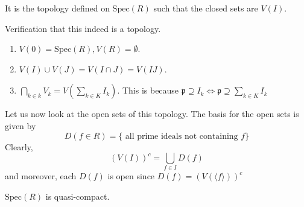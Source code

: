 \documentclass[oneside, 12pt, ]{scrbook}
\theoremstyle{theorem}
\begin{document}
\begin{definition}
It is the topology defined on $\mathrm{Spec}(R)$ such that the closed sets are $V(I)$.
\end{definition}

Verification that this indeed is a topology. 
\begin{enumerate}
\item $V(0) = \mathrm{Spec}(R), V(R) = \emptyset$.
\item $V(I) \cup V(J) = V(I\cap J) = V(IJ)$.
\item $\bigcap_{k \in k} V_{k} = V(\sum_{k \in K} I_{k})$. This is because $\mathfrak{p} \supseteq I_{k} \Leftrightarrow \mathfrak{p} \supseteq \sum_{k \in K}I_{k}$
\end{enumerate}

Let us now look at the open sets of this topology. The basis for the open sets is given by $$D(f \in R) = \{ \text{ all prime ideals not containing } f\}$$
Clearly, $$(V(I))^c = \bigcup_{f \in I} D(f)$$ and moreover, each $D(f)$ is open since $D(f) = (V(\langle f \rangle))^c$

\begin{theorem}
$\mathrm{Spec}(R)$ is quasi-compact.
\end{theorem}
\end{document}

